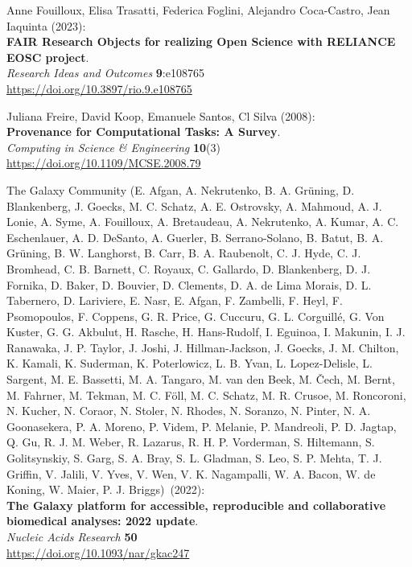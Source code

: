 \begin{thebibliography}{9}
Anne Fouilloux, Elisa Trasatti, Federica Foglini, Alejandro Coca-Castro, Jean Iaquinta (2023):\\
\textbf{FAIR Research Objects for realizing Open Science with RELIANCE EOSC project}.\\
\emph{Research Ideas and Outcomes} \textbf{9}:e108765 \\
\url{https://doi.org/10.3897/rio.9.e108765}

Juliana Freire, David Koop, Emanuele Santos, Cl Silva (2008):\\
\textbf{Provenance for Computational Tasks: A Survey}.\\
\emph{Computing in Science \& Engineering} \textbf{10}(3) \\
\url{https://doi.org/10.1109/MCSE.2008.79}

The Galaxy Community (E. Afgan, A. Nekrutenko, B. A.
Grüning, D. Blankenberg, J. Goecks, M. C. Schatz, A. E. Ostrovsky, A.
Mahmoud, A. J. Lonie, A. Syme, A. Fouilloux, A. Bretaudeau, A.
Nekrutenko, A. Kumar, A. C. Eschenlauer, A. D. DeSanto, A. Guerler, B.
Serrano-Solano, B. Batut, B. A. Grüning, B. W. Langhorst, B. Carr, B. A.
Raubenolt, C. J. Hyde, C. J. Bromhead, C. B. Barnett, C. Royaux, C.
Gallardo, D. Blankenberg, D. J. Fornika, D. Baker, D. Bouvier, D.
Clements, D. A. de Lima Morais, D. L. Tabernero, D. Lariviere, E. Nasr,
E. Afgan, F. Zambelli, F. Heyl, F. Psomopoulos, F. Coppens, G. R. Price,
G. Cuccuru, G. L. Corguillé, G. Von Kuster, G. G. Akbulut, H. Rasche, H.
Hans-Rudolf, I. Eguinoa, I. Makunin, I. J. Ranawaka, J. P. Taylor, J.
Joshi, J. Hillman-Jackson, J. Goecks, J. M. Chilton, K. Kamali, K.
Suderman, K. Poterlowicz, L. B. Yvan, L. Lopez-Delisle, L. Sargent, M.
E. Bassetti, M. A. Tangaro, M. van den Beek, M. Čech, M. Bernt, M.
Fahrner, M. Tekman, M. C. Föll, M. C. Schatz, M. R. Crusoe, M.
Roncoroni, N. Kucher, N. Coraor, N. Stoler, N. Rhodes, N. Soranzo, N.
Pinter, N. A. Goonasekera, P. A. Moreno, P. Videm, P. Melanie, P.
Mandreoli, P. D. Jagtap, Q. Gu, R. J. M. Weber, R. Lazarus, R. H. P.
Vorderman, S. Hiltemann, S. Golitsynskiy, S. Garg, S. A. Bray, S. L.
Gladman, S. Leo, S. P. Mehta, T. J. Griffin, V. Jalili, V. Yves, V. Wen,
V. K. Nagampalli, W. A. Bacon, W. de Koning, W. Maier, P. J. Briggs)~(2022):\\
\textbf{The Galaxy platform for accessible, reproducible and
collaborative biomedical analyses: 2022 update}.\\
\emph{Nucleic Acids Research} \textbf{50}\\
\url{https://doi.org/10.1093/nar/gkac247}


\end{thebibliography}
